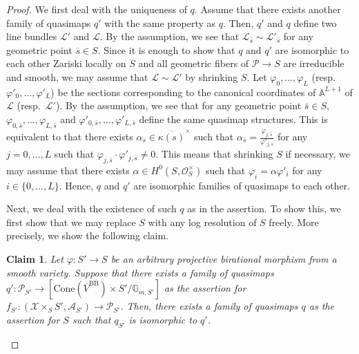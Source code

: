 \documentclass[10pt,a4paper]{amsart}
\newtheorem{claim*}{Claim}
\begin{document}
    \begin{proof}
        We first deal with the uniqueness of $q$.
        Assume that there exists another family of quasimaps $q'$ with the same property as $q$.
        Then, $q'$ and $q$ define two line bundles $\mathscr{L}'$ and $\mathscr{L}$.
        By the assumption, we see that $\mathscr{L}_{\bar{s}}\sim\mathscr{L}'_{\bar{s}}$ for any geometric point $\overline{s}\in S$.
Since it is enough to show that $q$ and $q'$ are isomorphic to each other Zariski locally on $S$ and all geometric fibers of $\mathcal{P}\to S$ are irreducible and smooth, we may assume that $\mathscr{L}\sim\mathscr{L}'$ by shrinking $S$.
Let $\varphi_0,\ldots,\varphi_L$ (resp.~$\varphi'_0,\ldots,\varphi'_L$) be the sections corresponding to the canonical coordinates of $\mathbb{A}^{L+1}$ of $\mathscr{L}$ (resp.~$\mathscr{L}'$).
By the assumption, we see that for any geometric point $\bar{s}\in S$, $\varphi_{0,\bar{s}},\ldots,\varphi_{L,\bar{s}}$ and $\varphi'_{0,\bar{s}},\ldots,\varphi'_{L,\bar{s}}$ define the same quasimap structures.
This is equivalent to that there exists $\alpha_{\bar{s}}\in\overline{\kappa(s)}^{\times}$ such that $\alpha_{\bar{s}}=\frac{\varphi_{j,\bar{s}}}{\varphi'_{j,\bar{s}}}$ for any $j=0,\ldots,L$ such that $\varphi_{j,\bar{s}}\cdot \varphi'_{j,\bar{s}}\ne0$.
This means that shrinking $S$ if necessary, we may assume that there exists $\alpha\in H^0(S,\mathcal{O}_S^{\times})$ such that $\varphi_i=\alpha \varphi'_i$ for any $i\in\{0,\ldots,L\}$.
Hence, $q$ and $q'$ are isomorphic families of quasimaps to each other.

Next, we deal with the existence of such $q$ as in the assertion.
To show this, we first show that we may replace $S$ with any log resolution of $S$ freely.
More precisely, we show the following claim.
\begin{claim*}
    Let $\varphi\colon S'\to S$ be an arbitrary projective birational morphism from a smooth variety.
    Suppose that there exists a family of quasimaps $q'\colon \mathcal{P}_{S'}\to [\mathrm{Cone}(\overline{V}^{\mathrm{BB}})\times S'/\mathbb{G}_{m,S'}]$ as the assertion for $f_{S'}\colon (\mathcal{X}\times_SS',\mathcal{A}_{S'})\to \mathcal{P}_{S'}$.
    Then, there exists a family of quasimaps $q$ as the assertion for $S$ such that $q_{S'}$ is isomorphic to $q'$.
\end{claim*}


\end{proof}
\end{document}
